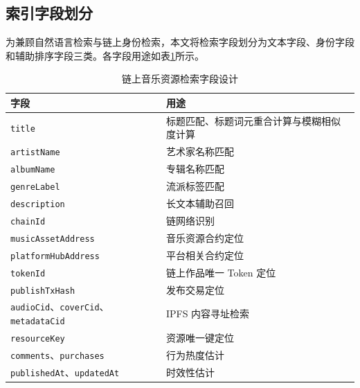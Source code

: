 \subsection{索引字段划分}

为兼顾自然语言检索与链上身份检索，本文将检索字段划分为文本字段、身份字段和辅助排序字段三类。各字段用途如表\ref{tab:ranking_fields_rewrite}所示。

\begin{table}[htbp]
    \linespread{1.5}
    \songti
    \centering
    \caption{链上音乐资源检索字段设计}\label{tab:ranking_fields_rewrite}
    \begin{tabular}{|p{3.35cm}|p{8.6cm}|}
        \hline
        字段                                                       & 用途                    \\ \hline
        \texttt{title}                                           & 标题匹配、标题词元重合计算与模糊相似度计算 \\ \hline
        \texttt{artistName}                                      & 艺术家名称匹配               \\ \hline
        \texttt{albumName}                                       & 专辑名称匹配                \\ \hline
        \texttt{genreLabel}                                      & 流派标签匹配                \\ \hline
        \texttt{description}                                     & 长文本辅助召回               \\ \hline
        \texttt{chainId}                                         & 链网络识别                 \\ \hline
        \texttt{musicAssetAddress}                               & 音乐资源合约定位              \\ \hline
        \texttt{platformHubAddress}                              & 平台相关合约定位              \\ \hline
        \texttt{tokenId}                                         & 链上作品唯一 Token 定位       \\ \hline
        \texttt{publishTxHash}                                   & 发布交易定位                \\ \hline
        \texttt{audioCid}、\texttt{coverCid}、\texttt{metadataCid} & IPFS 内容寻址检索           \\ \hline
        \texttt{resourceKey}                                     & 资源唯一键定位               \\ \hline
        \texttt{comments}、\texttt{purchases}                     & 行为热度估计                \\ \hline
        \texttt{publishedAt}、\texttt{updatedAt}                  & 时效性估计                 \\ \hline
    \end{tabular}
\end{table}

